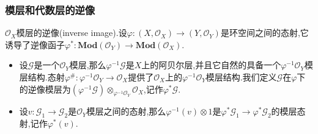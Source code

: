 \subsubsection{模层和代数层的逆像}

$\mathscr{O}_X$模层的逆像(inverse image).设$\varphi:(X,\mathscr{O}_X)\to(Y,\mathscr{O}_Y)$是环空间之间的态射,它诱导了逆像函子$\varphi^*:\textbf{Mod}(\mathscr{O}_Y)\to\textbf{Mod}(\mathscr{O}_X)$.
\begin{itemize}
	\item 设$\mathscr{G}$是一个$\mathscr{O}_Y$模层,那么$\varphi^{-1}\mathscr{G}$是$X$上的阿贝尔层,并且它自然的具备一个$\varphi^{-1}\mathscr{O}_Y$模层结构.态射$\varphi^{\#}:\varphi^{-1}\mathscr{O}_Y\to\mathscr{O}_X$提供了$\mathscr{O}_X$上的$\varphi^{-1}\mathscr{O}_Y$模层结构.我们定义$\mathscr{G}$在$\varphi$下的逆像模层为$(\varphi^{-1}\mathscr{G})\otimes_{\varphi^{-1}\mathscr{O}_Y}\mathscr{O}_X$,记作$\varphi^*\mathscr{G}$.
	\item 设$v:\mathscr{G}_1\to\mathscr{G}_2$是$\mathscr{O}_Y$模层之间的态射,那么$\varphi^{-1}(v)\otimes1$是$\varphi^*\mathscr{G}_1\to\varphi^*\mathscr{G}_2$的模层态射,记作$\varphi^*(v)$.
\end{itemize}

